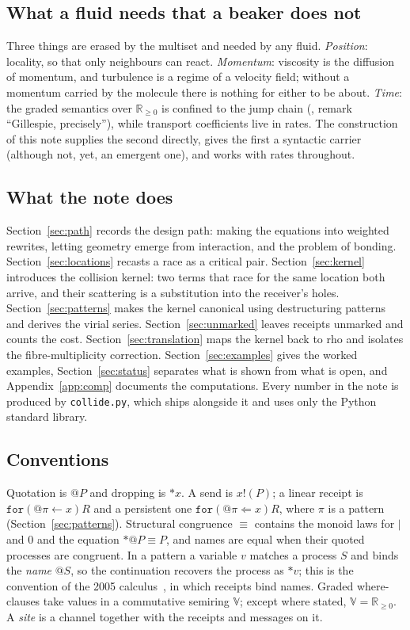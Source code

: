 \documentclass[11pt,a4paper]{article}
\theoremstyle{plain}
\theoremstyle{definition}
\theoremstyle{remark}
\newcommand{\rhoc}{\textsf{rho}}
\newcommand{\V}{\mathbb{V}}
\newcommand{\Rnn}{\mathbb{R}_{\geq 0}}
\newcommand{\scong}{\equiv}
\newcommand{\code}[1]{\texttt{#1}}
\begin{document}
\subsection{What a fluid needs that a beaker does not}

Three things are erased by the multiset and needed by any fluid.
\emph{Position}: locality, so that only neighbours can react. \emph{Momentum}:
viscosity is the diffusion of momentum, and turbulence is a regime of a velocity
field; without a momentum carried by the molecule there is nothing for either to
be about. \emph{Time}: the graded semantics over $\Rnn$ is confined to the jump
chain (\cite{PLN}, remark ``Gillespie, precisely''), while transport coefficients live in rates.
The construction of this note supplies the second directly, gives the first a
syntactic carrier (although not, yet, an emergent one), and works with rates
throughout.

\subsection{What the note does}

Section~\ref{sec:path} records the design path: making the equations into
weighted rewrites, letting geometry emerge from interaction, and the problem
of bonding. Section~\ref{sec:locations} recasts a race as a critical pair.
Section~\ref{sec:kernel} introduces the collision kernel: two terms that race
for the same location both arrive, and their scattering is a substitution into
the receiver's holes. Section~\ref{sec:patterns} makes the kernel canonical
using destructuring patterns and derives the virial series.
Section~\ref{sec:unmarked} leaves receipts unmarked and counts the cost.
Section~\ref{sec:translation} maps the kernel back to \rhoc{} and isolates the
fibre-multiplicity correction. Section~\ref{sec:examples} gives the worked
examples, Section~\ref{sec:status} separates what is shown from what is open,
and Appendix~\ref{app:comp} documents the computations. Every number in the
note is produced by \texttt{collide.py}, which ships alongside it and uses only
the Python standard library.

\subsection{Conventions}

Quotation is $@P$ and dropping is $*x$. A send is $x!(P)$; a linear receipt is
$\code{for}(@\pi \leftarrow x)R$ and a persistent one
$\code{for}(@\pi \Leftarrow x)R$, where $\pi$ is a pattern
(Section~\ref{sec:patterns}). Structural congruence $\scong$ contains the
monoid laws for $\mid$ and $0$ and the equation $*@P \scong P$, and names are
equal when their quoted processes are congruent. In a pattern a variable $v$
matches a process $S$ and binds the \emph{name} $@S$, so the continuation
recovers the process as $*v$; this is the convention of the 2005
calculus~\cite{MeredithRadestock}, in which receipts bind names. Graded
where-clauses take
values in a commutative semiring $\V$; except where stated, $\V = \Rnn$. A
\emph{site} is a channel together with the receipts and messages on it.
\end{document}
